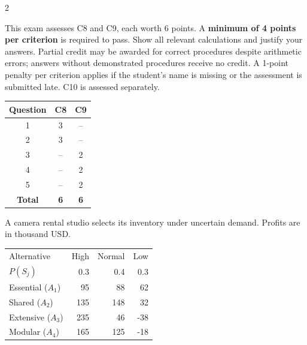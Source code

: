 	\begin{multicols}{2}
		\raggedcolumns
		
		This exam assesses C8 and C9, each worth 6 points. A \textbf{minimum of 4 points per criterion} is required to pass. Show all relevant calculations and justify your answers. Partial credit may be awarded for correct procedures despite arithmetic errors; answers without demonstrated procedures receive no credit. A 1-point penalty per criterion applies if the student's name is missing or the assessment is submitted late. C10 is assessed separately.
		
		\vspace{-3mm}
		\begin{center}
			\begin{tabular}{|c|c|c|}
				\hline
				\textbf{Question} & \textbf{C8} & \textbf{C9} \\ \hline
				1 & 3 & -- \\ \hline
				2 & 3 & -- \\ \hline
				3 & -- & 2 \\ \hline
				4 & -- & 2 \\ \hline
				5 & -- & 2 \\ \hline
				\textbf{Total} & \textbf{6} & \textbf{6} \\ \hline
			\end{tabular}
		\end{center}
		\vspace{-3mm}
		
		
A camera rental studio selects its inventory under uncertain demand. Profits are in thousand USD.

\vspace{-3mm}
\begin{center}\small\setlength{\tabcolsep}{4pt}
	\begin{tabular}{lrrr}\toprule
		Alternative & High & Normal & Low\\
		$P(S_j)$ & 0.3 & 0.4 & 0.3\\ \midrule
				Essential ($A_1$) & 95 & 88 & 62\\
		Shared ($A_2$) & 135 & 148 & 32\\
		Extensive ($A_3$) & 235 & 46 & -38\\
		Modular ($A_4$) & 165 & 125 & -18\\
		\bottomrule
	\end{tabular}
\end{center} \vspace*{-3mm}


\end{multicols}
